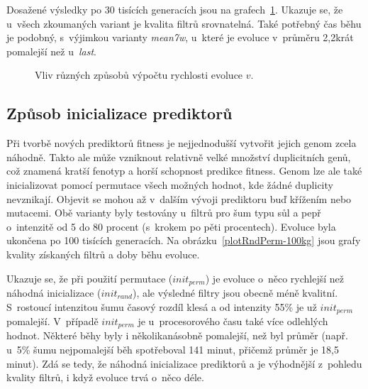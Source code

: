 Dosažené výsledky po 30 tisících generacích jsou na grafech~\ref{plotBwalg-30kg}. Ukazuje se, že u~všech zkoumaných variant je kvalita filtrů srovnatelná. Také potřebný čas běhu je podobný, s~výjimkou varianty \emph{mean7w}, u~které je evoluce v~průměru 2,2krát pomalejší než u~\emph{last}.

\begin{figure}[htb]
    \centering
    \captionsetup{aboveskip=0pt}
    \caption{Vliv různých způsobů výpočtu rychlosti evoluce $v$.}
    \label{plotBwalg-30kg}
\end{figure}

\subsection{Způsob inicializace prediktorů}

Při tvorbě nových prediktorů fitness je nejjednodušší vytvořit jejich genom zcela náhodně. Takto ale může vzniknout relativně velké množství duplicitních genů, což znamená kratší fenotyp a horší schopnost predikce fitness. Genom lze ale také inicializovat pomocí permutace všech možných hodnot, kde žádné duplicity nevznikají. Objevit se mohou až v~dalším vývoji prediktoru buď křížením nebo mutacemi. Obě varianty byly testovány u~filtrů pro šum typu sůl a pepř o~intenzitě od 5 do 80 procent (s~krokem po pěti procentech). Evoluce byla ukončena po 100 tisících generacích. Na obrázku~\ref{plotRndPerm-100kg} jsou grafy kvality získaných filtrů a doby běhu evoluce.

Ukazuje se, že při použití permutace ($\mathit{init}_\mathit{perm}$) je evoluce o~něco rychlejší než náhodná inicializace ($\mathit{init}_\mathit{rand}$), ale výsledné filtry jsou obecně méně kvalitní. S~rostoucí intenzitou šumu časový rozdíl klesá a od intenzity 55\% je už $\mathit{init}_\mathit{perm}$ pomalejší. V~případě $\mathit{init}_\mathit{perm}$ je u~procesorového času také více odlehlých hodnot. Některé běhy byly i několikanásobně pomalejší, než byl průměr (např. u~5\% šumu nejpomalejší běh spotřeboval 141 minut, přičemž průměr je 18,5 minut). Zdá se tedy, že náhodná inicializace prediktorů a je výhodnější z~pohledu kvality filtrů, i když evoluce trvá o~něco déle.

